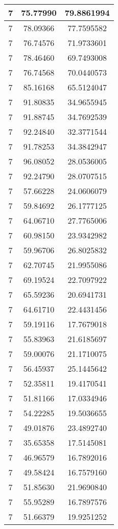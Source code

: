 \documentclass[
]{book}
\begin{document}
\begin{tabular}{c|c|c}
\hline
7 & 75.77990 & 79.8861994\\
\hline
7 & 78.09366 & 77.7595582\\
\hline
7 & 76.74576 & 71.9733601\\
\hline
7 & 78.46460 & 69.7493008\\
\hline
7 & 76.74568 & 70.0440573\\
\hline
7 & 85.16168 & 65.5124047\\
\hline
7 & 91.80835 & 34.9655945\\
\hline
7 & 91.88745 & 34.7692539\\
\hline
7 & 92.24840 & 32.3771544\\
\hline
7 & 91.78253 & 34.3842947\\
\hline
7 & 96.08052 & 28.0536005\\
\hline
7 & 92.24790 & 28.0707515\\
\hline
7 & 57.66228 & 24.0606079\\
\hline
7 & 59.84692 & 26.1777125\\
\hline
7 & 64.06710 & 27.7765006\\
\hline
7 & 60.98150 & 23.9342982\\
\hline
7 & 59.96706 & 26.8025832\\
\hline
7 & 62.70745 & 21.9955086\\
\hline
7 & 69.19524 & 22.7097922\\
\hline
7 & 65.59236 & 20.6941731\\
\hline
7 & 64.61710 & 22.4431456\\
\hline
7 & 59.19116 & 17.7679018\\
\hline
7 & 55.83963 & 21.6185697\\
\hline
7 & 59.00076 & 21.1710075\\
\hline
7 & 56.45937 & 25.1445642\\
\hline
7 & 52.35811 & 19.4170541\\
\hline
7 & 51.81166 & 17.0334946\\
\hline
7 & 54.22285 & 19.5036655\\
\hline
7 & 49.01876 & 23.4892740\\
\hline
7 & 35.65358 & 17.5145081\\
\hline
7 & 46.96579 & 16.7892016\\
\hline
7 & 49.58424 & 16.7579160\\
\hline
7 & 51.85630 & 21.9690840\\
\hline
7 & 55.95289 & 16.7897576\\
\hline
7 & 51.66379 & 19.9251252\\

\end{tabular}
\end{document}
